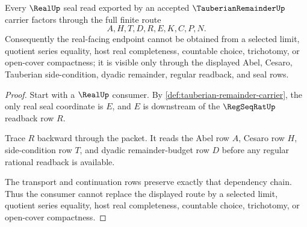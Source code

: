\begin{theorem}
\label{thm:tauberian-remainder-real-seal-nonescape}
Every $\RealUp$ seal read exported by an accepted $\TauberianRemainderUp$ carrier factors through the full finite route
$$
A,H,T,D,R,E,K,C,P,N.
$$
Consequently the real-facing endpoint cannot be obtained from a selected limit, quotient series equality, host real completeness, countable choice, trichotomy, or open-cover compactness; it is visible only through the displayed Abel, Cesaro, Tauberian side-condition, dyadic remainder, regular readback, and seal rows.
\end{theorem}
\begin{proof}
Start with a $\RealUp$ consumer. By \autoref{def:tauberian-remainder-carrier}, the only real seal coordinate is $E$, and $E$ is downstream of the $\RegSeqRatUp$ readback row $R$.

Trace $R$ backward through the packet. It reads the Abel row $A$, Cesaro row $H$, side-condition row $T$, and dyadic remainder-budget row $D$ before any regular rational readback is available.

The transport and continuation rows preserve exactly that dependency chain. Thus the consumer cannot replace the displayed route by a selected limit, quotient series equality, host real completeness, countable choice, trichotomy, or open-cover compactness.
\end{proof}




